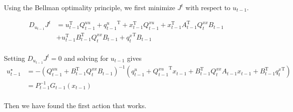 \documentclass{article}
\begin{document}
Using the Bellman optimality principle, we first minimize $J^t$ with respect to $u_{t-1}$.

\begin{align*}
    D_{u_{t-1}} J^t &= u_{t-1}^\mathrm{T} Q_{t-1}^{uu} + {q_{t-1}^u}^\mathrm{T} + x_{t-1}^\mathrm{T} Q_{t-1}^{xu} + x_{t-1}^\mathrm{T} A_{t-1}^\mathrm{T} Q_t^{xx} B_{t-1}\\
    &+ u_{t-1}^\mathrm{T} B_{t-1}^\mathrm{T} Q_t^{xx} B_{t-1} + {q_t^x}^\mathrm{T} B_{t-1} \\
\end{align*}

Setting $D_{u_{t-1}} J^t = 0$ and solving for $u_{t-1}$ gives
\begin{align*}
    u_{t-1}^\star &= -\left(Q_{t-1}^{uu} + B_{t-1}^\mathrm{T} Q_t^{xx} B_{t-1} \right)^{-1} \left( q_{t-1}^u + {Q_{t-1}^{xu}}^\mathrm{T} x_{t-1} + B_{t-1}^\mathrm{T} Q_t^{xx} A_{t-1} x_{t-1} + B_{t-1}^\mathrm{T} {q_t^x}^\mathrm{T} \right) \\
    &= P_{t-1}^\mathrm{-1} G_{t-1}(x_{t-1}) \\
\end{align*}

Then we have found the first action that works.
\end{document}
